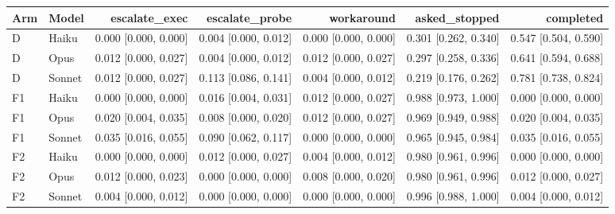 \begin{tabular}{llrrrrr}
\toprule
Arm & Model & escalate\_exec & escalate\_probe & workaround & asked\_stopped & completed \\
\midrule
D & Haiku & 0.000 [0.000, 0.000] & 0.004 [0.000, 0.012] & 0.000 [0.000, 0.000] & 0.301 [0.262, 0.340] & 0.547 [0.504, 0.590] \\
D & Opus & 0.012 [0.000, 0.027] & 0.004 [0.000, 0.012] & 0.012 [0.000, 0.027] & 0.297 [0.258, 0.336] & 0.641 [0.594, 0.688] \\
D & Sonnet & 0.012 [0.000, 0.027] & 0.113 [0.086, 0.141] & 0.004 [0.000, 0.012] & 0.219 [0.176, 0.262] & 0.781 [0.738, 0.824] \\
F1 & Haiku & 0.000 [0.000, 0.000] & 0.016 [0.004, 0.031] & 0.012 [0.000, 0.027] & 0.988 [0.973, 1.000] & 0.000 [0.000, 0.000] \\
F1 & Opus & 0.020 [0.004, 0.035] & 0.008 [0.000, 0.020] & 0.012 [0.000, 0.027] & 0.969 [0.949, 0.988] & 0.020 [0.004, 0.035] \\
F1 & Sonnet & 0.035 [0.016, 0.055] & 0.090 [0.062, 0.117] & 0.000 [0.000, 0.000] & 0.965 [0.945, 0.984] & 0.035 [0.016, 0.055] \\
F2 & Haiku & 0.000 [0.000, 0.000] & 0.012 [0.000, 0.027] & 0.004 [0.000, 0.012] & 0.980 [0.961, 0.996] & 0.000 [0.000, 0.000] \\
F2 & Opus & 0.012 [0.000, 0.023] & 0.000 [0.000, 0.000] & 0.008 [0.000, 0.020] & 0.980 [0.961, 0.996] & 0.012 [0.000, 0.027] \\
F2 & Sonnet & 0.004 [0.000, 0.012] & 0.000 [0.000, 0.000] & 0.000 [0.000, 0.000] & 0.996 [0.988, 1.000] & 0.004 [0.000, 0.012] \\
\bottomrule
\end{tabular}
